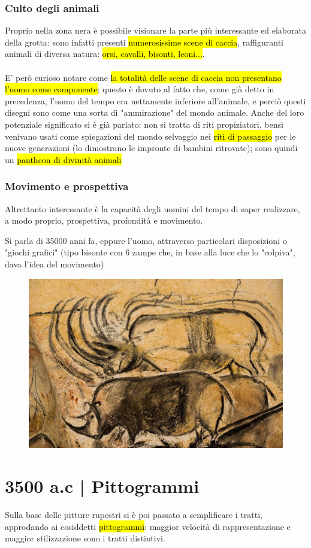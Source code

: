     \subsubsection{Culto degli animali}
    Proprio nella zona nera è possibile visionare la parte più interessante ed elaborata della grotta: sono infatti presenti \hl{numerosissime scene di caccia}, raffiguranti animali di diversa natura: \hl{orsi, cavalli, bisonti, leoni...}.
    \\\\ E' però curioso notare come \hl{la totalità delle scene di caccia non presentano l'uomo come componente}; questo è dovuto al fatto che, come già detto in precedenza, l'uomo del tempo era nettamente inferiore all'animale, e perciò questi disegni sono come una sorta di "ammirazione" del mondo animale. Anche del loro potenziale significato si è già parlato: non si tratta di riti propiziatori, bensì venivano usati come spiegazioni del mondo selvaggio nei \hl{riti di passaggio} per le nuove generazioni (lo dimostrano le impronte di bambini ritrovate); sono quindi un \hl{pantheon di divinità animali}
    \subsubsection{Movimento e prospettiva}
    Altrettanto interessante è la capacità degli uomini del tempo di saper realizzare, a modo proprio, prospettiva, profondità e movimento.

    Si parla di 35000 anni fa, eppure l'uomo, attraverso particolari disposizioni o "giochi grafici" (tipo bisonte con 6 zampe che, in base alla luce che lo "colpiva", dava l'idea del movimento)
    \begin{figure}[H]
    \centering
    \includegraphics[width=0.4\linewidth]{blocco_3 - storia della scrittura/imgs/la-grotta-chauvet-il-piu-antico-esempio-di-arte-preistorica-del-mondo-prende-vita-con-la-realta-virtuale_07.jpg}
\end{figure}
    
\section{3500 a.c | Pittogrammi}
Sulla base delle pitture rupestri si è poi passato a semplificare i tratti, approdando ai cosiddetti \hl{pittogrammi}: maggior velocità di rappresentazione e maggior stilizzazione sono i tratti distintivi.
